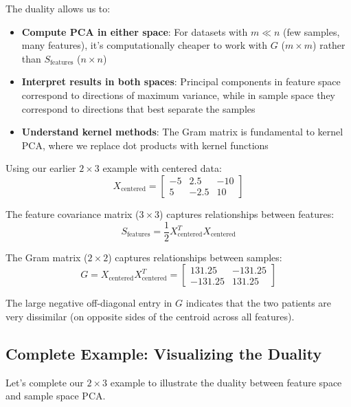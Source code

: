 \begin{notechapter}
\begin{remark}
The duality allows us to:
\begin{itemize}
    \item \textbf{Compute PCA in either space}: For datasets with $m \ll n$ (few samples, many features), it's computationally cheaper to work with $G$ ($m \times m$) rather than $S_{\text{features}}$ ($n \times n$)
    \item \textbf{Interpret results in both spaces}: Principal components in feature space correspond to directions of maximum variance, while in sample space they correspond to directions that best separate the samples
    \item \textbf{Understand kernel methods}: The Gram matrix is fundamental to kernel PCA, where we replace dot products with kernel functions
\end{itemize}
\end{remark}

\begin{remark}
Using our earlier $2 \times 3$ example with centered data:
\[
X_{\text{centered}} = \begin{bmatrix}
-5 & 2.5 & -10 \\
5 & -2.5 & 10
\end{bmatrix}
\]

The feature covariance matrix ($3 \times 3$) captures relationships between features:
\[
S_{\text{features}} = \frac{1}{2}X_{\text{centered}}^T X_{\text{centered}}
\]

The Gram matrix ($2 \times 2$) captures relationships between samples:
\[
G = X_{\text{centered}} X_{\text{centered}}^T = \begin{bmatrix}
131.25 & -131.25 \\
-131.25 & 131.25
\end{bmatrix}
\]

The large negative off-diagonal entry in $G$ indicates that the two patients are very dissimilar (on opposite sides of the centroid across all features).
\end{remark}

\subsection{Complete Example: Visualizing the Duality}

Let's complete our $2 \times 3$ example to illustrate the duality between feature space and sample space PCA.


\end{notechapter}
